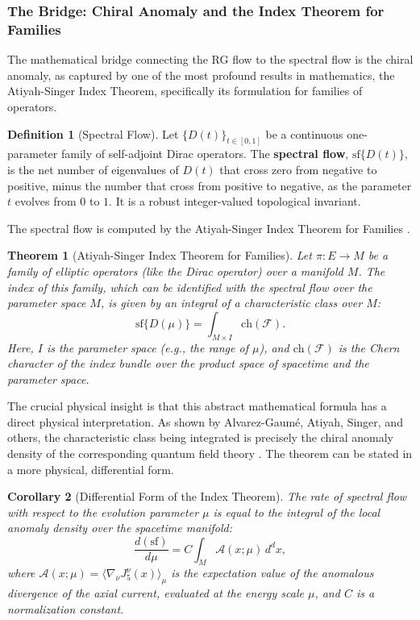 \documentclass[11pt, letterpaper]{report}
\theoremstyle{plain} %
\newtheorem{theorem}{Theorem}[chapter]
\newtheorem{corollary}[theorem]{Corollary}
\theoremstyle{definition} %
\newtheorem{definition}{Definition}[chapter]
\theoremstyle{remark} %
\newcommand{\ChernCh}{\text{ch}}
\begin{document}
\subsubsection{The Bridge: Chiral Anomaly and the Index Theorem for Families}

The mathematical bridge connecting the RG flow to the spectral flow is the chiral anomaly, as captured by one of the most profound results in mathematics, the Atiyah-Singer Index Theorem, specifically its formulation for families of operators.

\begin{definition}[Spectral Flow]
Let $\{D(t)\}_{t \in [0,1]}$ be a continuous one-parameter family of self-adjoint Dirac operators. The \textbf{spectral flow}, $\text{sf}\{D(t)\}$, is the net number of eigenvalues of $D(t)$ that cross zero from negative to positive, minus the number that cross from positive to negative, as the parameter $t$ evolves from $0$ to $1$. It is a robust integer-valued topological invariant.
\end{definition}

The spectral flow is computed by the Atiyah-Singer Index Theorem for Families \cite{Atiyah1984Anomalies, Atiyah1985Characters}.
\begin{theorem}[Atiyah-Singer Index Theorem for Families]
\label{thm:index_families}
Let $\pi: E \to M$ be a family of elliptic operators (like the Dirac operator) over a manifold $M$. The index of this family, which can be identified with the spectral flow over the parameter space $M$, is given by an integral of a characteristic class over $M$:
\begin{equation}
    \text{sf}\{D(\mu)\} = \int_{M \times I} \ChernCh(\mathcal{F}).
\end{equation}
Here, $I$ is the parameter space (e.g., the range of $\mu$), and $\ChernCh(\mathcal{F})$ is the Chern character of the index bundle over the product space of spacetime and the parameter space.
\end{theorem}

The crucial physical insight is that this abstract mathematical formula has a direct physical interpretation. As shown by Alvarez-Gaumé, Atiyah, Singer, and others, the characteristic class being integrated is precisely the chiral anomaly density of the corresponding quantum field theory \cite{AlvarezGaume1984Anomalies, AlvarezGaume1985Anomalies}. The theorem can be stated in a more physical, differential form.

\begin{corollary}[Differential Form of the Index Theorem]
\label{cor:diff_index_anomaly}
The rate of spectral flow with respect to the evolution parameter $\mu$ is equal to the integral of the local anomaly density over the spacetime manifold:
\begin{equation}
    \frac{d(\text{sf})}{d\mu} = C \int_M \mathcal{A}(x; \mu) \, d^dx,
    \label{eq:diff_index_anomaly_final}
\end{equation}
where $\mathcal{A}(x; \mu) = \langle \nabla_\nu J^\nu_5(x) \rangle_\mu$ is the expectation value of the anomalous divergence of the axial current, evaluated at the energy scale $\mu$, and $C$ is a normalization constant.
\end{corollary}
\end{document}
